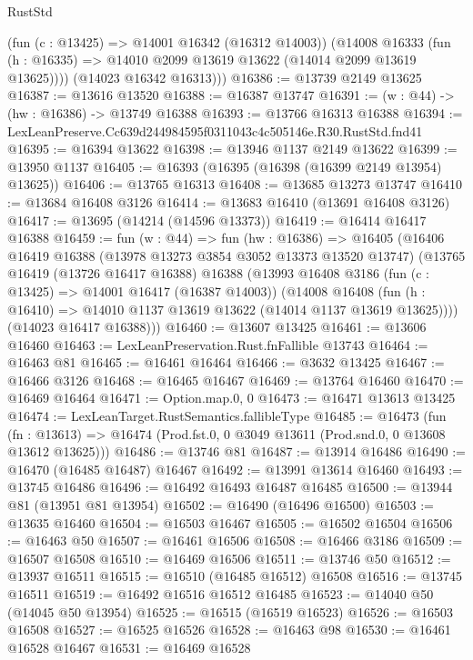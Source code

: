 \begin{lexlean}{RustStd}
\begin{coremodule}
          (fun (c : @13425) => @14001 @16342 (@16312 @14003))
          (@14008
            @16333
            (fun (h : @16335) => @14010 @2099 @13619 @13622 (@14014 @2099 @13619 @13625))))
        (@14023 @16342 @16313)))
@16386 := @13739 @2149 @13625
@16387 := @13616 @13520
@16388 := @16387 @13747
@16391 := (w : @44) -> (hw : @16386) -> @13749 @16388
@16393 := @13766 @16313 @16388
@16394 := LexLeanPreserve.Cc639d244984595f0311043c4c505146e.R30.RustStd.fnd41
@16395 := @16394 @13622
@16398 := @13946 @1137 @2149 @13622
@16399 := @13950 @1137
@16405 := @16393 (@16395 (@16398 (@16399 @2149 @13954) @13625))
@16406 := @13765 @16313
@16408 := @13685 @13273 @13747
@16410 := @13684 @16408 @3126
@16414 := @13683 @16410 (@13691 @16408 @3126)
@16417 := @13695 (@14214 (@14596 @13373))
@16419 := @16414 @16417 @16388
@16459 := fun (w : @44) =>
  fun (hw : @16386) =>
  @16405
    (@16406
      @16419
      @16388
      (@13978 @13273 @3854 @3052 @13373 @13520 @13747)
      (@13765
        @16419
        (@13726 @16417 @16388)
        @16388
        (@13993
          @16408
          @3186
          (fun (c : @13425) => @14001 @16417 (@16387 @14003))
          (@14008
            @16408
            (fun (h : @16410) => @14010 @1137 @13619 @13622 (@14014 @1137 @13619 @13625))))
        (@14023 @16417 @16388)))
@16460 := @13607 @13425
@16461 := @13606 @16460
@16463 := LexLeanPreservation.Rust.fnFallible @13743
@16464 := @16463 @81
@16465 := @16461 @16464
@16466 := @3632 @13425
@16467 := @16466 @3126
@16468 := @16465 @16467
@16469 := @13764 @16460
@16470 := @16469 @16464
@16471 := Option.map.{0, 0}
@16473 := @16471 @13613 @13425
@16474 := LexLeanTarget.RustSemantics.fallibleType
@16485 := @16473
    (fun (fn : @13613) =>
    @16474 (Prod.fst.{0, 0} @3049 @13611 (Prod.snd.{0, 0} @13608 @13612 @13625)))
@16486 := @13746 @81
@16487 := @13914 @16486
@16490 := @16470 (@16485 @16487) @16467
@16492 := @13991 @13614 @16460
@16493 := @13745 @16486
@16496 := @16492 @16493 @16487 @16485
@16500 := @13944 @81 (@13951 @81 @13954)
@16502 := @16490 (@16496 @16500)
@16503 := @13635 @16460
@16504 := @16503 @16467
@16505 := @16502 @16504
@16506 := @16463 @50
@16507 := @16461 @16506
@16508 := @16466 @3186
@16509 := @16507 @16508
@16510 := @16469 @16506
@16511 := @13746 @50
@16512 := @13937 @16511
@16515 := @16510 (@16485 @16512) @16508
@16516 := @13745 @16511
@16519 := @16492 @16516 @16512 @16485
@16523 := @14040 @50 (@14045 @50 @13954)
@16525 := @16515 (@16519 @16523)
@16526 := @16503 @16508
@16527 := @16525 @16526
@16528 := @16463 @98
@16530 := @16461 @16528 @16467
@16531 := @16469 @16528

\end{coremodule}
\end{lexlean}
